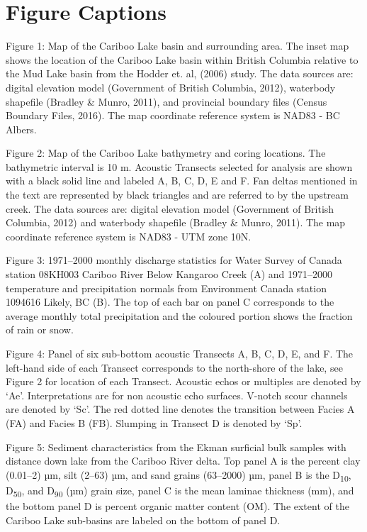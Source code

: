 \documentclass[
  letterpaper,
  DIV=11,
  numbers=noendperiod]{scrartcl}
\begin{document}
\pagebreak

\section{Figure Captions}\label{figure-captions}

Figure 1: Map of the Cariboo Lake basin and surrounding area. The inset
map shows the location of the Cariboo Lake basin within British Columbia
relative to the Mud Lake basin from the Hodder et. al, (2006) study. The
data sources are: digital elevation model (Government of British
Columbia, 2012), waterbody shapefile (Bradley \& Munro, 2011), and
provincial boundary files (Census Boundary Files, 2016). The map
coordinate reference system is NAD83 - BC Albers.

Figure 2: Map of the Cariboo Lake bathymetry and coring locations. The
bathymetric interval is 10 m. Acoustic Transects selected for analysis
are shown with a black solid line and labeled A, B, C, D, E and F. Fan
deltas mentioned in the text are represented by black triangles and are
referred to by the upstream creek. The data sources are: digital
elevation model (Government of British Columbia, 2012) and waterbody
shapefile (Bradley \& Munro, 2011). The map coordinate reference system
is NAD83 - UTM zone 10N.

Figure 3: 1971--2000 monthly discharge statistics for Water Survey of
Canada station 08KH003 Cariboo River Below Kangaroo Creek (A) and
1971--2000 temperature and precipitation normals from Environment Canada
station 1094616 Likely, BC (B). The top of each bar on panel C
corresponds to the average monthly total precipitation and the coloured
portion shows the fraction of rain or snow.

Figure 4: Panel of six sub-bottom acoustic Transects A, B, C, D, E, and
F. The left-hand side of each Transect corresponds to the north-shore of
the lake, see Figure 2 for location of each Transect. Acoustic echos or
multiples are denoted by `Ae'. Interpretations are for non acoustic echo
surfaces. V-notch scour channels are denoted by `Sc'. The red dotted
line denotes the transition between Facies A (FA) and Facies B (FB).
Slumping in Transect D is denoted by `Sp'.

Figure 5: Sediment characteristics from the Ekman surficial bulk samples
with distance down lake from the Cariboo River delta. Top panel A is the
percent clay (0.01--2) µm, silt (2--63) µm, and sand grains (63--2000)
µm, panel B is the D\textsubscript{10}, D\textsubscript{50}, and
D\textsubscript{90} (µm) grain size, panel C is the mean laminae
thickness (mm), and the bottom panel D is percent organic matter content
(OM). The extent of the Cariboo Lake sub-basins are labeled on the
bottom of panel D.
\end{document}

